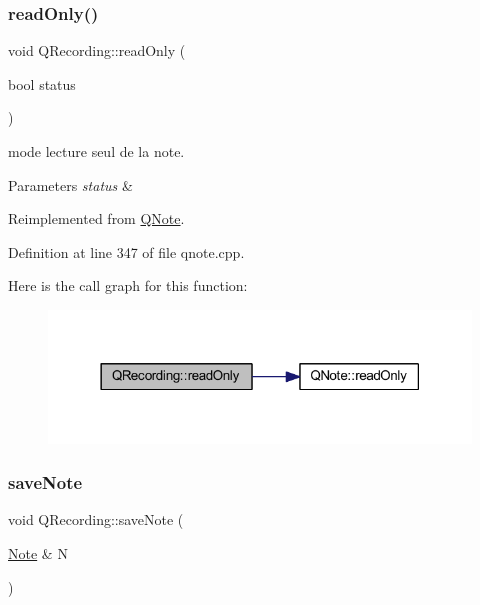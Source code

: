 \subsubsection{\texorpdfstring{read\+Only()}{readOnly()}}
{\footnotesize\ttfamily void Q\+Recording\+::read\+Only (\begin{DoxyParamCaption}\item[{bool}]{status }\end{DoxyParamCaption})\hspace{0.3cm}{\ttfamily [virtual]}}



mode lecture seul de la note. 


\begin{DoxyParams}{Parameters}
{\em status} & \\
\hline
\end{DoxyParams}


Reimplemented from \hyperlink{class_q_note_ae6fb14b839acc1979b145a892d6a0a92}{Q\+Note}.



Definition at line 347 of file qnote.\+cpp.

Here is the call graph for this function\+:\nopagebreak
\begin{figure}[H]
\begin{center}
\leavevmode
\includegraphics[width=318pt]{class_q_recording_a98fa21d8814450c0d912c8ce102ca832_cgraph}
\end{center}
\end{figure}
\mbox{\label{class_q_recording_a37492f3dbda2dad2a8cd62012fe91b78}} 
\subsubsection{\texorpdfstring{save\+Note}{saveNote}}
{\footnotesize\ttfamily void Q\+Recording\+::save\+Note (\begin{DoxyParamCaption}\item[{\hyperlink{class_note}{Note} \&}]{N }\end{DoxyParamCaption})\hspace{0.3cm}{\ttfamily [slot]}}



